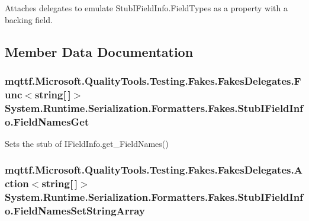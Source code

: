 Attaches delegates to emulate Stub\-I\-Field\-Info.\-Field\-Types as a property with a backing field.



\subsection{Member Data Documentation}
\hypertarget{class_system_1_1_runtime_1_1_serialization_1_1_formatters_1_1_fakes_1_1_stub_i_field_info_af5efdd2303e7d31538c68d4db2c95ee5}{
\subsubsection[{Field\-Names\-Get}]{\setlength{\rightskip}{0pt plus 5cm}mqttf.\-Microsoft.\-Quality\-Tools.\-Testing.\-Fakes.\-Fakes\-Delegates.\-Func$<$string\mbox{[}$\,$\mbox{]}$>$ System.\-Runtime.\-Serialization.\-Formatters.\-Fakes.\-Stub\-I\-Field\-Info.\-Field\-Names\-Get}}\label{class_system_1_1_runtime_1_1_serialization_1_1_formatters_1_1_fakes_1_1_stub_i_field_info_af5efdd2303e7d31538c68d4db2c95ee5}


Sets the stub of I\-Field\-Info.\-get\-\_\-\-Field\-Names()

\hypertarget{class_system_1_1_runtime_1_1_serialization_1_1_formatters_1_1_fakes_1_1_stub_i_field_info_a5ec1cb1b7fed25bf551b6666a6c14382}{
\subsubsection[{Field\-Names\-Set\-String\-Array}]{\setlength{\rightskip}{0pt plus 5cm}mqttf.\-Microsoft.\-Quality\-Tools.\-Testing.\-Fakes.\-Fakes\-Delegates.\-Action$<$string\mbox{[}$\,$\mbox{]}$>$ System.\-Runtime.\-Serialization.\-Formatters.\-Fakes.\-Stub\-I\-Field\-Info.\-Field\-Names\-Set\-String\-Array}}\label{class_system_1_1_runtime_1_1_serialization_1_1_formatters_1_1_fakes_1_1_stub_i_field_info_a5ec1cb1b7fed25bf551b6666a6c14382}


